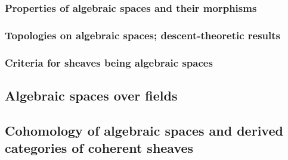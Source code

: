         \subsubsection{Properties of algebraic spaces and their morphisms}
        
        \subsubsection{Topologies on algebraic spaces; descent-theoretic results}
        
        \subsubsection{Criteria for sheaves being algebraic spaces}
    
    \subsection{Algebraic spaces over fields}

    \subsection{Cohomology of algebraic spaces and derived categories of coherent sheaves}